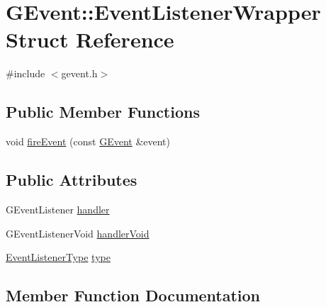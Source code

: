 \hypertarget{structGEvent_1_1EventListenerWrapper}{}\section{G\+Event\+:\+:Event\+Listener\+Wrapper Struct Reference}
\label{structGEvent_1_1EventListenerWrapper}


{\ttfamily \#include $<$gevent.\+h$>$}

\subsection*{Public Member Functions}
\begin{DoxyCompactItemize}
\item 
void \mbox{\hyperlink{structGEvent_1_1EventListenerWrapper_a421f6b8531f0dcdf5a0789e19fe0fc34}{fire\+Event}} (const \mbox{\hyperlink{classGEvent}{G\+Event}} \&event)
\end{DoxyCompactItemize}
\subsection*{Public Attributes}
\begin{DoxyCompactItemize}
\item 
G\+Event\+Listener \mbox{\hyperlink{structGEvent_1_1EventListenerWrapper_a8d738047c9fa291eb0f9efc3901f8e46}{handler}}
\item 
G\+Event\+Listener\+Void \mbox{\hyperlink{structGEvent_1_1EventListenerWrapper_a4357f29254774b2596977655f39ed6cc}{handler\+Void}}
\item 
\mbox{\hyperlink{classGEvent_a0fa812f40726abdb17ef8b98637b223b}{Event\+Listener\+Type}} \mbox{\hyperlink{structGEvent_1_1EventListenerWrapper_a4e85a4f103b996aa159eef55b1b5de7e}{type}}
\end{DoxyCompactItemize}


\subsection{Member Function Documentation}
\mbox{\label{structGEvent_1_1EventListenerWrapper_a421f6b8531f0dcdf5a0789e19fe0fc34}} 

